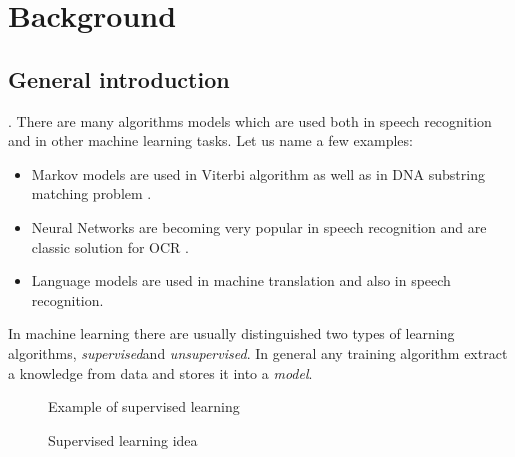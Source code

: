 \chapter{Background}
\label{cha:background}


\section{General introduction} 
\label{sec:general_introduction}
.
There are many algorithms models which are used both in speech recognition and in other machine learning tasks.
Let us name a few examples:
\begin{itemize}
    \item Markov models are used in Viterbi algorithm as well as in DNA substring matching problem \cite{TODO}.
    \item Neural Networks are becoming very popular in speech recognition \cite{TODO} and are classic solution for OCR \cite{TODO}.
    \item Language models are used in machine translation and also in speech recognition. 
\end{itemize}

In machine learning there are usually distinguished two types of learning algorithms, {\it supervised}\/and {\it unsupervised}.
In general any training algorithm extract a knowledge from data and stores it into a {\it model}.


\begin{figure}
    \begin{center}
    
    \caption{Example of supervised learning}
    \label{fig:supervised-bw} 
    \end{center}
\end{figure}

\begin{figure}
    \begin{center}
    
    \caption{Supervised learning idea}
    \label{fig:supervised-gen} 
    \end{center}
\end{figure}


